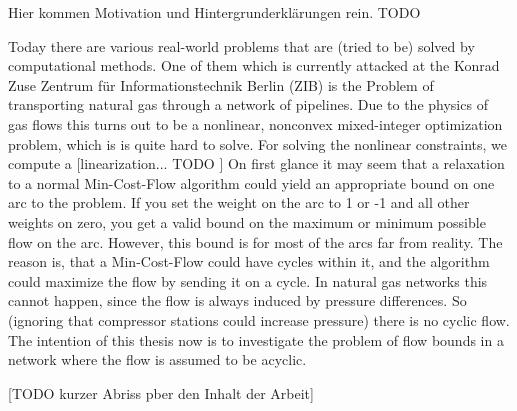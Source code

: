 Hier kommen Motivation und Hintergrunderklärungen rein. TODO


Today there are various real-world problems that are (tried to be) solved by computational methods. One of them which 
is currently attacked at the Konrad Zuse Zentrum für Informationstechnik Berlin (ZIB) is the Problem of transporting 
natural gas through a network of pipelines. Due to the physics of gas flows this turns out to be a nonlinear, nonconvex 
mixed-integer optimization problem, which is is quite hard to solve. 
For solving the nonlinear constraints, we compute a [linearization... TODO ]
On first glance it may seem that a relaxation to a normal Min-Cost-Flow algorithm could yield an appropriate bound 
on one arc to the problem. If you set the weight on the arc to 1 or -1 and all other weights on zero, you get a 
valid bound on the maximum or minimum possible flow on the arc. However, this bound is for most of the arcs far from 
reality. The reason is, that a Min-Cost-Flow could have cycles within it, and the algorithm could maximize the flow by 
sending it on a cycle. In natural gas networks this cannot happen, since the flow is always induced by pressure 
differences. So (ignoring that compressor stations could increase pressure) there is no cyclic flow. 
The intention of this thesis now is to investigate the problem of flow bounds in a network where the flow is assumed 
to be acyclic. 

[TODO kurzer Abriss pber den Inhalt der Arbeit]